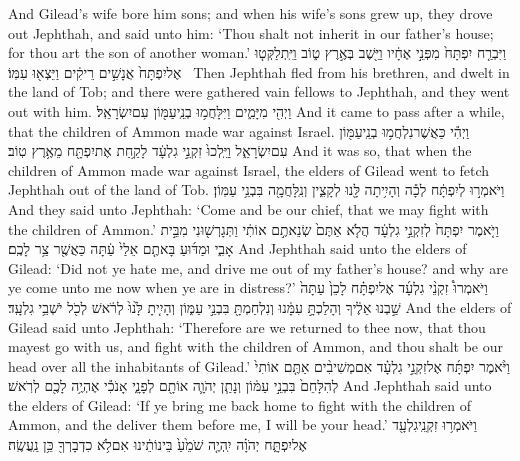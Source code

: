 {And Gilead’s wife bore him sons; and when his wife’s sons grew up, they drove out Jephthah, and said unto him: ‘Thou shalt not inherit in our father’s house; for thou art the son of another woman.’}
{וַיִּבְרַ֤ח יִפְתָּח֙ מִפְּנֵ֣י אֶחָ֔יו וַיֵּ֖שֶׁב בְּאֶ֣רֶץ ט֑וֹב וַיִּֽתְלַקְּט֤וּ אֶל\maqqaf יִפְתָּח֙ אֲנָשִׁ֣ים רֵיקִ֔ים וַיֵּצְא֖וּ עִמּֽוֹ׃ \petucha }
{Then Jephthah fled from his brethren, and dwelt in the land of Tob; and there were gathered vain fellows to Jephthah, and they went out with him.}
{וַיְהִ֖י מִיָּמִ֑ים וַיִּלָּחֲמ֥וּ בְנֵֽי\maqqaf עַמּ֖וֹן עִם\maqqaf יִשְׂרָאֵֽל׃}
{And it came to pass after a while, that the children of Ammon made war against Israel.}
{וַיְהִ֕י כַּאֲשֶׁר\maqqaf נִלְחֲמ֥וּ בְנֵֽי\maqqaf עַמּ֖וֹן עִם\maqqaf יִשְׂרָאֵ֑ל וַיֵּֽלְכוּ֙ זִקְנֵ֣י גִלְעָ֔ד לָקַ֥חַת אֶת\maqqaf יִפְתָּ֖ח מֵאֶ֥רֶץ טֽוֹב׃}
{And it was so, that when the children of Ammon made war against Israel, the elders of Gilead went to fetch Jephthah out of the land of Tob.}
{וַיֹּאמְר֣וּ לְיִפְתָּ֔ח לְכָ֕ה וְהָיִ֥יתָה לָּ֖נוּ לְקָצִ֑ין וְנִֽלָּחֲמָ֖ה בִּבְנֵ֥י עַמּֽוֹן׃}
{And they said unto Jephthah: ‘Come and be our chief, that we may fight with the children of Ammon.’}
{וַיֹּ֤אמֶר יִפְתָּח֙ לְזִקְנֵ֣י גִלְעָ֔ד הֲלֹ֤א אַתֶּם֙ שְׂנֵאתֶ֣ם אוֹתִ֔י וַתְּגָרְשׁ֖וּנִי מִבֵּ֣ית אָבִ֑י וּמַדּ֜וּעַ בָּאתֶ֤ם אֵלַי֙ עַ֔תָּה כַּאֲשֶׁ֖ר צַ֥ר לָכֶֽם׃}
{And Jephthah said unto the elders of Gilead: ‘Did not ye hate me, and drive me out of my father’s house? and why are ye come unto me now when ye are in distress?’}
{וַיֹּאמְרוּ֩ זִקְנֵ֨י גִלְעָ֜ד אֶל\maqqaf יִפְתָּ֗ח לָכֵן֙ עַתָּה֙ שַׁ֣בְנוּ אֵלֶ֔יךָ וְהָלַכְתָּ֣ עִמָּ֔נוּ וְנִלְחַמְתָּ֖ בִּבְנֵ֣י עַמּ֑וֹן וְהָיִ֤יתָ לָּ֙נוּ֙ לְרֹ֔אשׁ לְכֹ֖ל יֹשְׁבֵ֥י גִלְעָֽד׃}
{And the elders of Gilead said unto Jephthah: ‘Therefore are we returned to thee now, that thou mayest go with us, and fight with the children of Ammon, and thou shalt be our head over all the inhabitants of Gilead.’}
{וַיֹּ֨אמֶר יִפְתָּ֜ח אֶל\maqqaf זִקְנֵ֣י גִלְעָ֗ד אִם\maqqaf מְשִׁיבִ֨ים אַתֶּ֤ם אוֹתִי֙ לְהִלָּחֵם֙ בִּבְנֵ֣י עַמּ֔וֹן וְנָתַ֧ן יְהֹוָ֛ה אוֹתָ֖ם לְפָנָ֑י אָנֹכִ֕י אֶהְיֶ֥ה לָכֶ֖ם לְרֹֽאשׁ׃}
{And Jephthah said unto the elders of Gilead: ‘If ye bring me back home to fight with the children of Ammon, and the \lord\space deliver them before me, I will be your head.’}
{וַיֹּאמְר֥וּ זִקְנֵֽי\maqqaf גִלְעָ֖ד אֶל\maqqaf יִפְתָּ֑ח יְהֹוָ֗ה יִֽהְיֶ֤ה שֹׁמֵ֙עַ֙ בֵּינוֹתֵ֔ינוּ אִם\maqqaf לֹ֥א כִדְבָרְךָ֖ כֵּ֥ן נַֽעֲשֶֽׂה׃}
